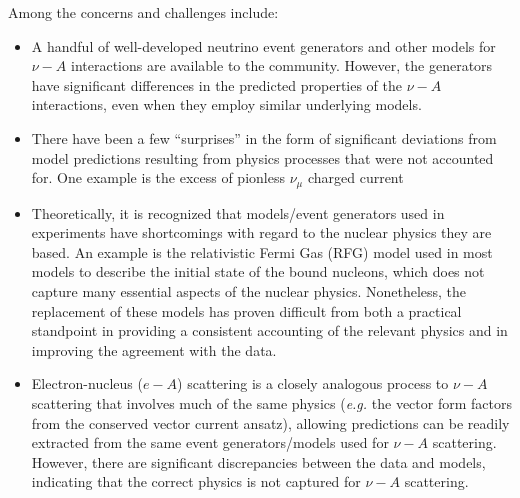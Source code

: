 Among the concerns and challenges include:
\begin{itemize}
\item A handful of well-developed neutrino event generators and other models for $\nu-A$ interactions are available to the community. However, the generators have significant differences in the predicted properties of the $\nu-A$ interactions, even when they employ similar underlying models.
\item There have been a few ``surprises'' in the form of significant deviations from model predictions resulting from physics processes that were not accounted for. One example is the excess of pionless $\nu_\mu$ charged current 
\item Theoretically, it is recognized that models/event generators used in experiments have shortcomings with regard to the nuclear physics they are based. An example is the relativistic Fermi Gas (RFG) model used in most models to describe the initial state of the bound nucleons, which does not capture many essential aspects of the nuclear physics. Nonetheless, the replacement of these models has proven difficult from both a practical standpoint in providing a consistent accounting of the relevant physics and in improving the agreement with the data.
\item Electron-nucleus ($e-A$) scattering is a closely analogous process to $\nu-A$ scattering that involves much of the same physics ({\em e.g.} the vector form factors from the conserved vector current ansatz), allowing predictions can be readily extracted from the same event generators/models used for $\nu-A$ scattering. However, there are significant discrepancies between the data and models, indicating that the correct physics is not captured for $\nu-A$ scattering.
\end{itemize}







